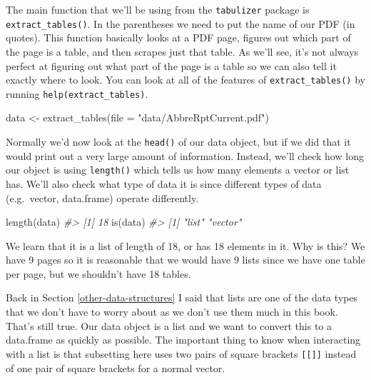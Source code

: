 \documentclass[
]{krantz}
\makeatletter
\newenvironment{Shaded}{\begin{snugshade}}{\end{snugshade}}
\newcommand{\AttributeTok}[1]{\textcolor[rgb]{0.61,0.61,0.61}{#1}}
\newcommand{\CommentTok}[1]{\textcolor[rgb]{0.37,0.37,0.37}{\textit{#1}}}
\newcommand{\FunctionTok}[1]{\textcolor[rgb]{0,0,0}{#1}}
\newcommand{\NormalTok}[1]{#1}
\newcommand{\OtherTok}[1]{\textcolor[rgb]{0.37,0.37,0.37}{#1}}
\newcommand{\StringTok}[1]{\textcolor[rgb]{0.5,0.5,0.5}{#1}}
\newenvironment{kframe}{%
\medskip{}
\setlength{\fboxsep}{.8em}
 \def\at@end@of@kframe{}%
 \ifinner\ifhmode%
  \def\at@end@of@kframe{\end{minipage}}%
  \begin{minipage}{\columnwidth}%
 \fi\fi%
 \def\FrameCommand##1{\hskip\@totalleftmargin \hskip-\fboxsep
 \colorbox{shadecolor}{##1}\hskip-\fboxsep
     \hskip-\linewidth \hskip-\@totalleftmargin \hskip\columnwidth}%
 \MakeFramed {\advance\hsize-\width
   \@totalleftmargin\z@ \linewidth\hsize
   \@setminipage}}%
 {\par\unskip\endMakeFramed%
 \at@end@of@kframe}
\renewenvironment{Shaded}{\begin{kframe}}{\end{kframe}}
\makeatother
\begin{document}
The main function that we'll be using from the
\texttt{tabulizer} package is \texttt{extract\_tables()}. In
the parentheses we need to put the name of our PDF (in
quotes). This function basically looks at a PDF page,
figures out which part of the page is a table, and then
scrapes just that table. As we'll see, it's not always
perfect at figuring out what part of the page is a table so
we can also tell it exactly where to look. You can look at
all of the features of \texttt{extract\_tables()} by running
\texttt{help(extract\_tables)}.

\begin{Shaded}
\begin{Highlighting}[]
\NormalTok{data }\OtherTok{\textless{}{-}} \FunctionTok{extract\_tables}\NormalTok{(}\AttributeTok{file =} \StringTok{"data/AbbreRptCurrent.pdf"}\NormalTok{)}
\end{Highlighting}
\end{Shaded}

Normally we'd now look at the \texttt{head()} of our data
object, but if we did that it would print out a very large
amount of information. Instead, we'll check how long our
object is using \texttt{length()} which tells us how many
elements a vector or list has. We'll also check what type of
data it is since different types of data (e.g.~vector,
data.frame) operate differently.

\begin{Shaded}
\begin{Highlighting}[]
\FunctionTok{length}\NormalTok{(data)}
\CommentTok{\#\textgreater{} [1] 18}
\FunctionTok{is}\NormalTok{(data)}
\CommentTok{\#\textgreater{} [1] "list"   "vector"}
\end{Highlighting}
\end{Shaded}

We learn that it is a list of length of 18, or has 18
elements in it. Why is this? We have 9 pages so it is
reasonable that we would have 9 lists since we have one
table per page, but we shouldn't have 18 tables.

Back in Section \ref{other-data-structures} I said that
lists are one of the data types that we don't have to worry
about as we don't use them much in this book. That's still
true. Our data object is a list and we want to convert this
to a data.frame as quickly as possible. The important thing
to know when interacting with a list is that subsetting here
uses two pairs of square brackets \texttt{{[}{[}{]}{]}}
instead of one pair of square brackets for a normal vector.
\end{document}

